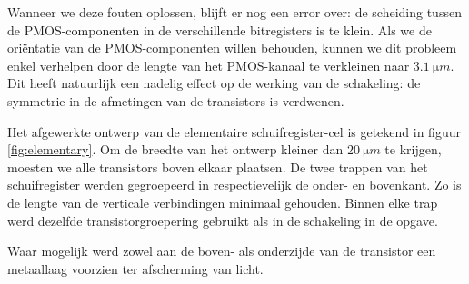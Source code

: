 \documentclass[11pt,a4paper,oneside,dutch]{article}
\begin{document}
Wanneer we deze fouten oplossen, blijft er nog een error over: de scheiding tussen de PMOS-componenten in de verschillende bitregisters is te klein. Als we de oriëntatie van de PMOS-componenten willen behouden, kunnen we dit probleem enkel verhelpen door de lengte van het PMOS-kanaal te verkleinen naar $\SI{3,1}{\micro m}$. Dit heeft natuurlijk een nadelig effect op de werking van de schakeling: de symmetrie in de afmetingen van de transistors is verdwenen.

Het afgewerkte ontwerp van de elementaire schuifregister-cel is getekend in figuur \ref{fig:elementary}. Om de breedte van het ontwerp kleiner dan $\SI{20}{\micro m}$ te krijgen, moesten we alle transistors boven elkaar plaatsen. De twee trappen van het schuifregister werden gegroepeerd in respectievelijk de onder- en bovenkant. Zo is de lengte van de verticale verbindingen minimaal gehouden. Binnen elke trap werd dezelfde transistorgroepering gebruikt als in de schakeling in de opgave.

Waar mogelijk werd zowel aan de boven- als onderzijde van de transistor een metaallaag voorzien ter afscherming van licht.
\end{document}
